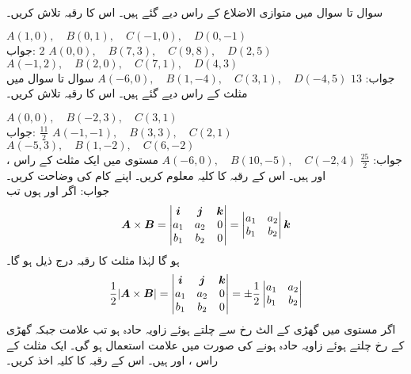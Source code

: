 \\
سوال  تا سوال  میں متوازی الاضلاع کے راس دیے گئے ہیں۔ اس کا رقبہ تلاش کریں۔

$A(1,0),\quad B(0,1),\quad C(-1,0),\quad D(0,-1)$\\
جواب:\quad
$2$
$A(0,0),\quad B(7,3),\quad C(9,8),\quad D(2,5)$
$A(-1,2),\quad B(2,0),\quad C(7,1),\quad D(4,3)$\\
جواب:\quad
$13$
$A(-6,0),\quad B(1,-4),\quad C(3,1),\quad D(-4,5)$
سوال  تا سوال  میں مثلث کے راس دیے گئے ہیں۔ اس کا رقبہ تلاش کریں۔

$A(0,0),\quad B(-2,3),\quad C(3,1)$\\
جواب:\quad
$\tfrac{11}{2}$
$A(-1,-1),\quad B(3,3),\quad C(2,1)$
$A(-5,3),\quad B(1,-2),\quad C(6,-2)$\\
جواب:\quad
$\tfrac{25}{2}$
$A(-6,0),\quad B(10,-5),\quad C(-2,4)$
مستوی  میں ایک مثلث کے راس ،  اور  ہیں۔ اس کے رقبہ کا کلیہ معلوم کریں۔ اپنے کام کی وضاحت کریں۔\\
جواب:\quad
اگر  اور  ہوں تب
\begin{align*}
{\ensuremath{{\boldsymbol{A}}}}\times{\ensuremath{{\boldsymbol{B}}}}=\begin{vmatrix} {\boldsymbol{i}}&{\boldsymbol{j}}&{\boldsymbol{k}}\\ a_1&a_2&0\\b_1&b_2&0 \end{vmatrix}=
\begin{vmatrix}a_1&a_2\\b_1&b_2 \end{vmatrix}{\boldsymbol{k}}
\end{align*}
ہو گا لہٰذا مثلث کا رقبہ درج ذیل ہو گا۔
 \begin{align*}
\frac{1}{2}\abs{{{\boldsymbol{A}}}\times{\ensuremath{{\boldsymbol{B}}}}}=\begin{vmatrix} {\boldsymbol{i}}&{\boldsymbol{j}}&{\boldsymbol{k}}\\ a_1&a_2&0\\b_1&b_2&0 \end{vmatrix}=
\pm \frac{1}{2}\begin{vmatrix}a_1&a_2\\b_1&b_2 \end{vmatrix}
\end{align*}
اگر مستوی میں گھڑی کے الٹ رخ  سے  چلتے ہوئے  زاویہ حادہ  ہو تب  علامت جبکہ گھڑی کے رخ چلتے ہوئے زاویہ حادہ ہونے کی صورت میں  علامت استعمال ہو گی۔
ایک مثلث کے راس ،  اور  ہیں۔ اس کے رقبہ کا کلیہ اخذ کریں۔ 
